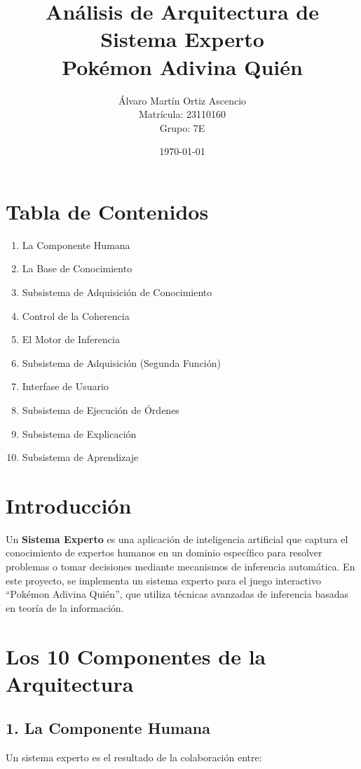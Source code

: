 \documentclass[12pt,a4paper]{article}
\title{\textbf{Análisis de Arquitectura de Sistema Experto} \\ \large Pokémon Adivina Quién}
\author{Álvaro Martín Ortiz Ascencio \\ Matrícula: 23110160 \\ Grupo: 7E}
\date{\today}
\begin{document}
\maketitle

\section*{Tabla de Contenidos}
\begin{enumerate}
    \item La Componente Humana
    \item La Base de Conocimiento
    \item Subsistema de Adquisición de Conocimiento
    \item Control de la Coherencia
    \item El Motor de Inferencia
    \item Subsistema de Adquisición (Segunda Función)
    \item Interfase de Usuario
    \item Subsistema de Ejecución de Órdenes
    \item Subsistema de Explicación
    \item Subsistema de Aprendizaje
\end{enumerate}

\newpage

\section{Introducción}

Un \textbf{Sistema Experto} es una aplicación de inteligencia artificial que captura el conocimiento de expertos humanos en un dominio específico para resolver problemas o tomar decisiones mediante mecanismos de inferencia automática. En este proyecto, se implementa un sistema experto para el juego interactivo ``Pokémon Adivina Quién'', que utiliza técnicas avanzadas de inferencia basadas en teoría de la información.

\section{Los 10 Componentes de la Arquitectura}

\subsection{1. La Componente Humana}

Un sistema experto es el resultado de la colaboración entre:
\end{document}
